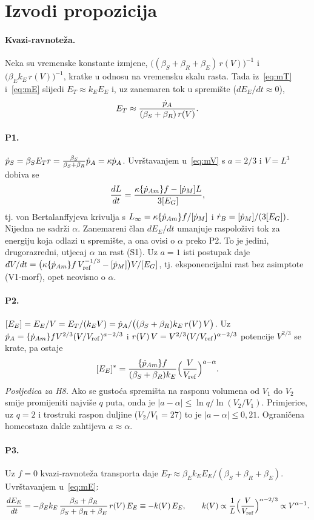 \appendix
\section{Izvodi propozicija}\label{app:izvodi}

\paragraph{Kvazi-ravnoteža.} Neka su vremenske konstante izmjene, $\big((\beta_S+\beta_R+\beta_E)\,r(V)\big)^{-1}$ i $\big(\beta_E k_E\,r(V)\big)^{-1}$, kratke u odnosu na vremensku skalu rasta. Tada iz~\eqref{eq:mT} i~\eqref{eq:mE} slijedi $E_T\approx k_E E_E$ i, uz zanemaren tok u spremište ($dE_E/dt\approx0$),
\[
E_T\approx\frac{\dot{p}_A}{(\beta_S+\beta_R)\,r(V)} .
\]

\paragraph{P1.} $\dot{p}_S=\beta_S E_T r=\frac{\beta_S}{\beta_S+\beta_R}\dot{p}_A=\kappa\dot{p}_A$. Uvrštavanjem u~\eqref{eq:mV} s $a=2/3$ i $V=L^3$ dobiva se
\[
\frac{dL}{dt}=\frac{\kappa\{\dot p_{Am}\} f-[\dot p_M] L}{3[E_G]},
\]
tj. von Bertalanffyjeva krivulja s $L_\infty=\kappa\{\dot p_{Am}\} f/[\dot p_M]$ i $\dot r_B=[\dot p_M]/(3[E_G])$. Nijedna ne sadrži $\alpha$. Zanemareni član $dE_E/dt$ umanjuje raspoloživi tok za energiju koja odlazi u spremište, a ona ovisi o $\alpha$ preko P2. To je jedini, drugorazredni, utjecaj $\alpha$ na rast (S1). Uz $a=1$ isti postupak daje $dV/dt=\big(\kappa\{\dot p_{Am}\} f\,V_{\mathrm{ref}}^{-1/3}-[\dot p_M]\big)V/[E_G]$, tj. eksponencijalni rast bez asimptote (V1-morf), opet neovisno o $\alpha$.

\paragraph{P2.} $[E_E]=E_E/V=E_T/(k_E V)=\dot{p}_A/\big((\beta_S+\beta_R)k_E\,r(V)\,V\big)$. Uz $\dot{p}_A=\{\dot p_{Am}\} fV^{2/3}(V/V_{\mathrm{ref}})^{a-2/3}$ i $r(V)\,V=V^{2/3}(V/V_{\mathrm{ref}})^{\alpha-2/3}$ potencije $V^{2/3}$ se krate, pa ostaje
\[
[E_E]^{\ast}=\frac{\{\dot p_{Am}\} f}{(\beta_S+\beta_R)k_E}\Big(\frac{V}{V_{\mathrm{ref}}}\Big)^{a-\alpha}.
\]
\emph{Posljedica za H8.} Ako se gustoća spremišta na rasponu volumena od $V_1$ do $V_2$ smije promijeniti najviše $q$ puta, onda je $|a-\alpha|\le\ln q/\ln(V_2/V_1)$. Primjerice, uz $q=2$ i trostruki raspon duljine ($V_2/V_1=27$) to je $|a-\alpha|\le0{,}21$. Ograničena homeostaza dakle zahtijeva $a\approx\alpha$.

\paragraph{P3.} Uz $f=0$ kvazi-ravnoteža transporta daje $E_T\approx\beta_E k_E E_E/(\beta_S+\beta_R+\beta_E)$. Uvrštavanjem u~\eqref{eq:mE}:
\[
\frac{dE_E}{dt}=-\beta_E k_E\,\frac{\beta_S+\beta_R}{\beta_S+\beta_R+\beta_E}\,r(V)\,E_E\equiv-k(V)\,E_E,
\qquad k(V)\propto\frac1L\Big(\frac{V}{V_{\mathrm{ref}}}\Big)^{\alpha-2/3}\propto V^{\alpha-1}.
\]

